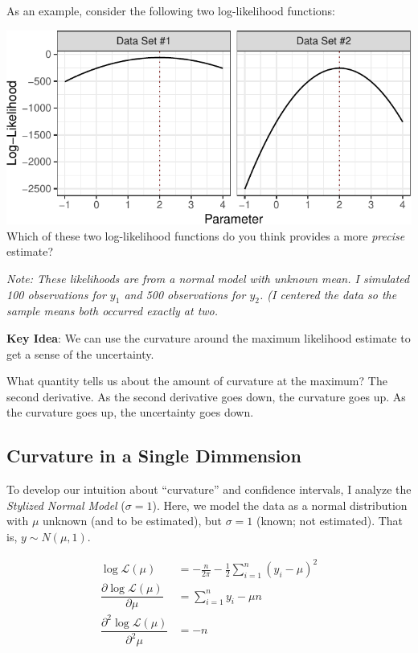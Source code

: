 \documentclass[
]{book}
\begin{document}
As an example, consider the following two log-likelihood functions:

\includegraphics{04-02-wald-cis_files/figure-latex/unnamed-chunk-2-1.pdf}
Which of these two log-likelihood functions do you think provides a more \emph{precise} estimate?

\emph{Note: These likelihoods are from a normal model with unknown mean. I simulated 100 observations for \(y_1\) and 500 observations for \(y_2\). (I centered the data so the sample means both occurred exactly at two.}

\textbf{Key Idea}: We can use the curvature around the maximum likelihood estimate to get a sense of the uncertainty.

What quantity tells us about the amount of curvature at the maximum? The second derivative. As the second derivative goes down, the curvature goes up.
As the curvature goes up, the uncertainty goes down.

\hypertarget{curvature-in-a-single-dimmension}{%
\subsection{Curvature in a Single Dimmension}\label{curvature-in-a-single-dimmension}}

To develop our intuition about ``curvature'' and confidence intervals, I analyze the \emph{Stylized Normal Model} (\(\sigma = 1\)). Here, we model the data as a normal distribution with \(\mu\) unknown (and to be estimated), but \(\sigma = 1\) (known; not estimated). That is, \(y \sim N(\mu, 1)\).

\[
\begin{aligned}
\log \mathcal{L}(\mu) &= -\frac{n}{2\pi} - \frac{1}{2}\sum_{i = 1}^n (y_i - \mu)^2\\
\dfrac{\partial \log \mathcal{L}(\mu)}{\partial \mu} &= \sum_{i = 1}^n y_i - \mu n\\
\dfrac{\partial^2 \log \mathcal{L}(\mu)}{\partial^2 \mu} &=  - n
\end{aligned}
\]
\end{document}
